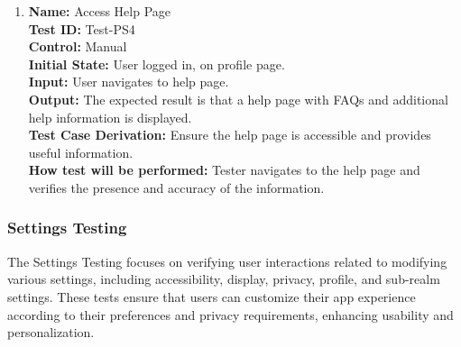 \documentclass[12pt, titlepage]{article}
\begin{document}
\begin{enumerate}
  \item \textbf{Name:} {Access Help Page} \label{itm:Test-PS4}\\
        \textbf{Test ID:} Test-PS4\\
        \textbf{Control:} Manual \\
        \textbf{Initial State:} User logged in, on profile page. \\
        \textbf{Input:} User navigates to help page. \\
        \textbf{Output:} The expected result is that a help page with FAQs and additional help information is displayed. \\
        \textbf{Test Case Derivation:} Ensure the help page is accessible and provides useful information. \\
        \textbf{How test will be performed:} Tester navigates to the help page and verifies the presence and accuracy of the information.
\end{enumerate}

\subsubsection{Settings Testing}
\label{sec:settings_testing}

The Settings Testing focuses on verifying user interactions related to modifying various settings, including accessibility, display, privacy, profile, and sub-realm settings. These tests ensure that users can customize their app experience according to their preferences and privacy requirements, enhancing usability and personalization.
\end{document}
